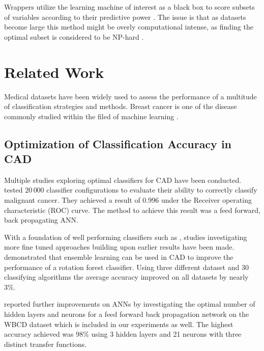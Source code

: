 Wrappers utilize the learning machine of interest as a black box to score subsets of variables according to their predictive power \parencite{guyon2003}. The issue is that as datasets become large this method might be overly computational intense, as finding the optimal subset is considered to be NP-hard \parencite{amaldi1998}.


\section{Related Work}

Medical datasets have been widely used to assess the performance of a multitude of classification strategies and methods. Breast cancer is one of the disease commonly studied within the filed of machine learning \parencite{kononenko2001}.

\subsection{Optimization of Classification Accuracy in CAD}

Multiple studies exploring optimal classifiers for CAD have been conducted. \textcite{ramos2012} tested $20\,000$ classifier configurations to evaluate their ability to correctly classify malignant cancer. They achieved a result of 0.996 under the Receiver operating characteristic (ROC) curve. The method to achieve this result was a feed forward, back propagating ANN.

With a foundation of well performing classifiers such as \parencite{ramos2012}, studies investigating more fine tuned approaches building upon earlier results have been made. \textcite{akin2011} demonstrated that ensemble learning can be used in CAD to improve the performance of a rotation forest classifier. Using three different dataset and 30 classifying algorithms the average accuracy improved on all datasets by nearly 3\%.

\textcite{Abdel-Ilah2017} reported further improvements on ANNs by investigating the optimal number of hidden layers and neurons for a feed forward back propagation network on the WBCD dataset which is included in our experiments as well. The highest accuracy achieved was 98\% using 3 hidden layers and 21 neurons with three distinct transfer functions.

